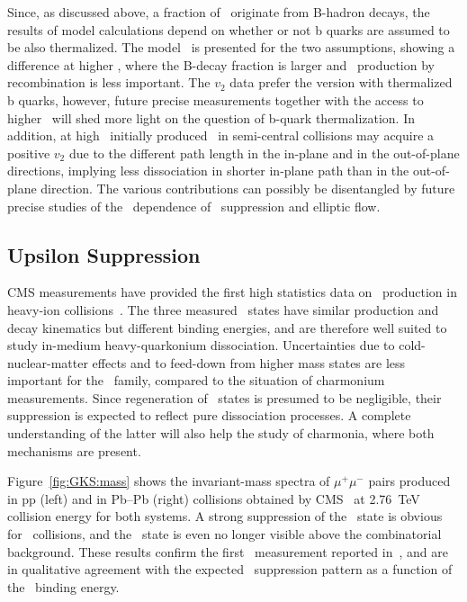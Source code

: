  Since, as discussed above, a fraction of \Jpsi\ originate from B-hadron decays, the results of model calculations depend on whether or not b quarks are assumed to be also thermalized. The model~\cite{Liu:2009gx} is presented for the two assumptions, showing a difference at higher \pt, where the B-decay fraction is larger and \Jpsi\ production by recombination is less important. The $v_2$ data prefer the version with thermalized b quarks, however, future precise measurements together with the access to higher \pt\ will shed more light on the question of b-quark thermalization. In addition, at high \pt\ initially produced \Jpsi\ in semi-central collisions may acquire a positive $v_2$ due to the different path length in the in-plane and in the out-of-plane directions, implying less dissociation in shorter in-plane path than in the out-of-plane direction. The various contributions can possibly be disentangled
by future precise studies of the \pT\ dependence of \Jpsi\ suppression and elliptic flow.

\subsection{Upsilon Suppression}

CMS measurements have provided the first high statistics data on \PgU\ production in heavy-ion collisions~\cite{CMS_Y_2010}. The three measured \PgU\ states have similar production and decay kinematics but different binding energies, and are therefore well suited to study in-medium heavy-quarkonium dissociation.
Uncertainties due to cold-nuclear-matter effects and to feed-down from higher mass states are less important for the \PgU\ family, compared to the situation of charmonium measurements. Since regeneration of \PgU\ states is presumed to be negligible, their suppression is expected to reflect pure dissociation processes. A complete understanding of the latter will also help the study of charmonia, where both mechanisms are present.

Figure~\ref{fig:GKS:mass} shows the invariant-mass spectra of $\mu^+\mu^-$ pairs produced in pp (left) and in Pb--Pb (right) collisions obtained by CMS~\cite{Chatrchyan:2012lxa} at 2.76~TeV collision energy for both systems.
A strong suppression of the \PgUb\ state is obvious for \PbPb\ collisions, and the \PgUc\ state is even no longer visible above the combinatorial background. These results confirm the first \PgU\ measurement reported in~\cite{CMS_Y_2010}, and are in qualitative agreement with the expected \PgU\ suppression pattern as a function of the \PgUn\ binding energy.


